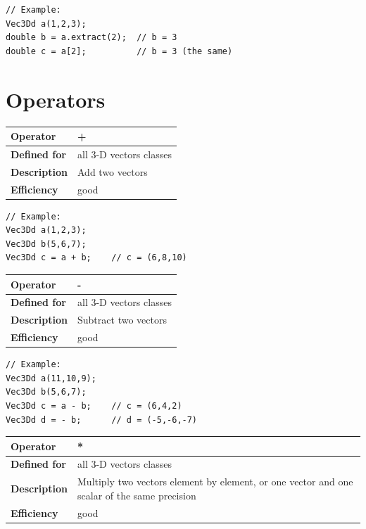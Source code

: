 \documentclass[11pt,a4paper,oneside,openright]{report}
\newcommand{\vspacesmall}{\vspace{3mm}}
\newcommand{\vspacebig}{\vspace{6mm}}
\begin{document}
\begin{lstlisting}[frame=none]
// Example:
Vec3Dd a(1,2,3);
double b = a.extract(2);  // b = 3
double c = a[2];          // b = 3 (the same)
\end{lstlisting}
\vspacebig


\chapter{Operators}\label{chap:Operators}

\begin{tabular}{|p{25mm}|p{100mm}|}
\hline
\bfseries Operator & + \\ \hline
\bfseries Defined for & all 3-D vectors classes  \\ \hline
\bfseries Description & Add two vectors \\ \hline
\bfseries Efficiency & good \\ \hline
\end{tabular}
\vspacesmall

\begin{lstlisting}[frame=none]
// Example:
Vec3Dd a(1,2,3);
Vec3Dd b(5,6,7);
Vec3Dd c = a + b;    // c = (6,8,10)
\end{lstlisting}
\vspacebig


\begin{tabular}{|p{25mm}|p{100mm}|}
\hline
\bfseries Operator & - \\ \hline
\bfseries Defined for & all 3-D vectors classes  \\ \hline
\bfseries Description & Subtract two vectors \\ \hline
\bfseries Efficiency & good \\ \hline
\end{tabular}
\vspacesmall

\begin{lstlisting}[frame=none]
// Example:
Vec3Dd a(11,10,9);
Vec3Dd b(5,6,7);
Vec3Dd c = a - b;    // c = (6,4,2)
Vec3Dd d = - b;      // d = (-5,-6,-7)
\end{lstlisting}
\vspacebig


\begin{tabular}{|p{25mm}|p{100mm}|}
\hline
\bfseries Operator & * \\ \hline
\bfseries Defined for & all 3-D vectors classes  \\ \hline
\bfseries Description & Multiply two vectors element by element, or one vector and one scalar of the same precision \\ \hline
\bfseries Efficiency & good \\ \hline
\end{tabular}
\vspacesmall
\end{document}

